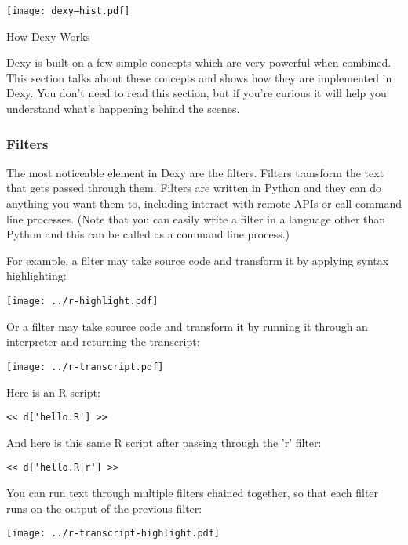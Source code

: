 \documentclass[custom, plainsections]{sciposter}
\begin{document}
\begin{multicols*}{2}
\texttt{[image: dexy--hist.pdf]}


\pagebreak

\large
How Dexy Works
\vspace{5pt}
\small

Dexy is built on a few simple concepts which are very powerful when combined. This section talks about these concepts and shows how they are implemented in Dexy. You don't need to read this section, but if you're curious it will help you understand what's happening behind the scenes.

\subsubsection*{Filters}

The most noticeable element in Dexy are the filters. Filters transform the text that gets passed through them. Filters are written in Python and they can do anything you want them to, including interact with remote APIs or call command line processes. (Note that you can easily write a filter in a language other than Python and this can be called as a command line process.)

For example, a filter may take source code and transform it by applying syntax highlighting:

\texttt{[image: ../r-highlight.pdf]}

Or a filter may take source code and transform it by running it through an interpreter and returning the transcript:

\texttt{[image: ../r-transcript.pdf]}

\vspace{0.5cm}

Here is an R script:
\tiny
\begin{Verbatim}
<< d['hello.R'] >>
\end{Verbatim}
\small

And here is this same R script after passing through the 'r' filter:

\tiny
\begin{Verbatim}
<< d['hello.R|r'] >>
\end{Verbatim}
\small

You can run text through multiple filters chained together, so that each filter runs on the output of the previous filter:

\vspace{0.5cm}
\texttt{[image: ../r-transcript-highlight.pdf]}
\vspace{0.5cm}


\end{multicols*}
\end{document}
